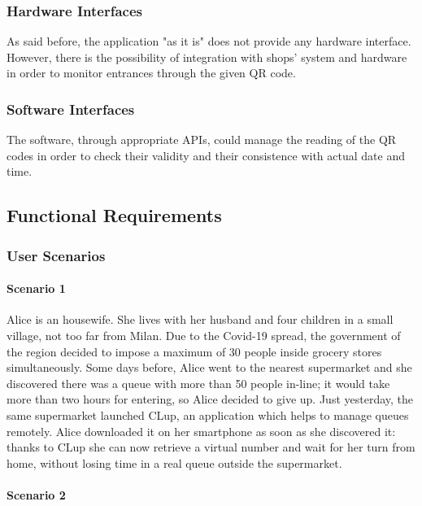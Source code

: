 \documentclass[table, 12pt]{article}
\begin{document}
\subsubsection{Hardware Interfaces}
As said before, the application "as it is" does not provide any hardware interface.
However, there is the possibility of integration with shops' system and hardware in order to monitor entrances through the given QR code.
\subsubsection{Software Interfaces}
The software, through appropriate APIs, could manage the reading of the QR codes in order to check their validity and their consistence with actual date and time.


\subsection{Functional Requirements}
\subsubsection{User Scenarios}
\paragraph{Scenario 1}

Alice is an housewife. She lives with her husband and four children in a small village, not too far from Milan. Due to the Covid-19 spread, the government of the region decided to impose a maximum of 30 people inside grocery stores simultaneously. Some days before, Alice went to the nearest supermarket and she discovered there was a queue with more than 50 people in-line; it would take more than two hours for entering, so Alice decided to give up. Just yesterday, the same supermarket launched CLup, an application which helps to manage queues remotely. Alice downloaded it on her smartphone as soon as she discovered it: thanks to CLup she can now retrieve a virtual number and wait for her turn from home, without losing time in a real queue outside the supermarket.\\


\paragraph{Scenario 2}
\end{document}
